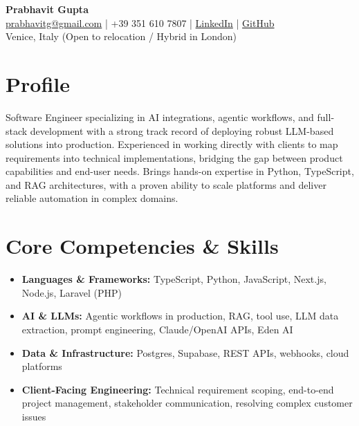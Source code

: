 \documentclass[10pt, a4paper]{article}
\begin{document}
\pagestyle{empty}

\begin{center}
    \Huge \textbf{Prabhavit Gupta} \\
    \vspace{4pt}
    \normalsize \href{mailto:prabhavitg@gmail.com}{prabhavitg@gmail.com} \quad | \quad +39 351 610 7807 \quad | \quad \href{https://www.linkedin.com/in/prabhavit/}{LinkedIn} \quad | \quad \href{https://github.com/prab-gupta}{GitHub} \\
    \vspace{2pt}
    Venice, Italy (Open to relocation / Hybrid in London)
\end{center}

\vspace{10pt}

\section{Profile}
Software Engineer specializing in AI integrations, agentic workflows, and full-stack development with a strong track record of deploying robust LLM-based solutions into production. Experienced in working directly with clients to map requirements into technical implementations, bridging the gap between product capabilities and end-user needs. Brings hands-on expertise in Python, TypeScript, and RAG architectures, with a proven ability to scale platforms and deliver reliable automation in complex domains.

\section{Core Competencies \& Skills}
\begin{itemize}[leftmargin=*, noitemsep]
    \item \textbf{Languages \& Frameworks:} TypeScript, Python, JavaScript, Next.js, Node.js, Laravel (PHP)
    \item \textbf{AI \& LLMs:} Agentic workflows in production, RAG, tool use, LLM data extraction, prompt engineering, Claude/OpenAI APIs, Eden AI
    \item \textbf{Data \& Infrastructure:} Postgres, Supabase, REST APIs, webhooks, cloud platforms
    \item \textbf{Client-Facing Engineering:} Technical requirement scoping, end-to-end project management, stakeholder communication, resolving complex customer issues
\end{itemize}
\end{document}
